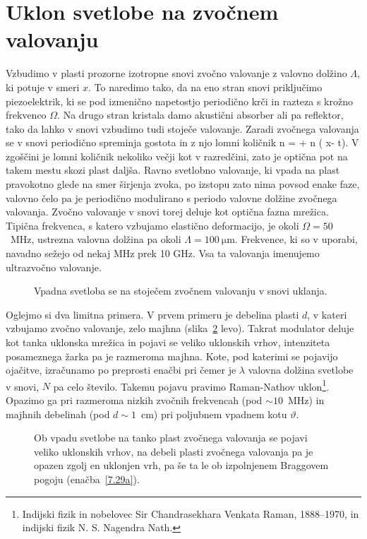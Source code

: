 \section{Uklon svetlobe na zvočnem valovanju}
Vzbudimo v plasti prozorne izotropne snovi zvočno valovanje z valovno dolžino $\Lambda$, 
ki potuje v smeri $x$. To naredimo tako, da na eno stran snovi priključimo piezoelektrik, 
ki se pod izmenično napetostjo periodično krči in razteza s krožno frekvenco $\Omega$.
Na drugo stran kristala damo akustični absorber ali pa reflektor, tako da lahko 
v snovi vzbudimo tudi stoječe valovanje. 
Zaradi zvočnega valovanja se v snovi periodično spreminja gostota in 
z njo lomni količnik
\beq
n =  + \Delta n \sin \left(\frac{2\pi}{\Lambda} x- \Omega t\right).
\eeq
V zgoščini je lomni količnik nekoliko večji kot v razredčini, zato je optična pot na takem mestu
skozi plast daljša. Ravno svetlobno valovanje, ki vpada na plast pravokotno glede
na smer širjenja zvoka, po izstopu zato nima povsod enake faze, 
valovno čelo pa je periodično modulirano s periodo 
valovne dolžine zvočnega valovanja. Zvočno valovanje v snovi torej deluje kot 
optična fazna mrežica. Tipična frekvenca, s katero vzbujamo elastično
deformacijo, je okoli $\Omega=50$~MHz, ustrezna valovna dolžina pa okoli $\Lambda = 100~\si{\micro\metre}$. 
Frekvence, ki so v uporabi, navadno sežejo od nekaj MHz prek 10 GHz. Vsa ta valovanja imenujemo
ultrazvočno valovanje. 

\begin{figure}[h]
\centering
\def\svgwidth{60truemm} 

\caption{Vpadna svetloba se na stoječem zvočnem valovanju v snovi uklanja.}
\label{fig:ao}
\end{figure}

Oglejmo si dva limitna primera. V prvem primeru je debelina plasti $d$, 
v kateri vzbujamo zvočno valovanje, zelo majhna (slika~\ref{fig:ao_bragg} levo). 
Takrat modulator deluje kot tanka uklonska mrežica in pojavi se veliko 
uklonskih vrhov, intenziteta posameznega žarka pa je razmeroma majhna. 
Kote, pod katerimi se pojavijo ojačitve, izračunamo po preprosti enačbi
pri čemer je $\lambda$ valovna dolžina svetlobe v snovi, $N$ pa celo število. Takemu pojavu 
pravimo Raman-Nathov uklon\footnote{Indijski fizik in nobelovec Sir Chandrasekhara 
Venkata Raman, 1888--1970, 
in indijski fizik N. S. Nagendra Nath.}. 
Opazimo ga pri razmeroma nizkih zvočnih frekvencah 
(pod $\sim10$~MHz) in majhnih debelinah (pod $d\sim 1$~cm) pri poljubnem vpadnem 
kotu $\vartheta$.
\begin{figure}[h]
\centering
\def\svgwidth{50truemm} 
\qquad
\def\svgwidth{65truemm} 

\caption{Ob vpadu svetlobe na tanko plast zvočnega valovanja se pojavi veliko uklonskih vrhov, 
na debeli plasti zvočnega valovanja pa je opazen zgolj en uklonjen vrh, 
pa še ta le ob izpolnjenem Braggovem pogoju (enačba~\ref{7.29a}).}
\label{fig:ao_bragg}
\end{figure}

